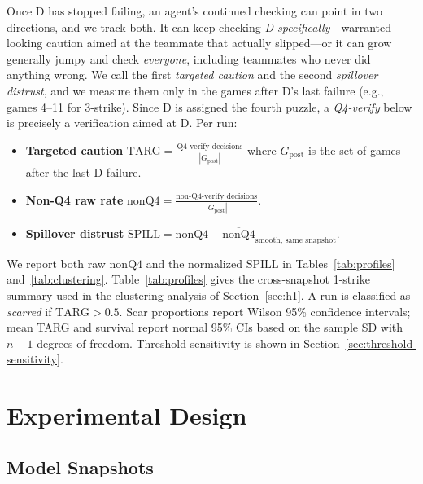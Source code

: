 \documentclass{article}
\begin{document}
Once D has stopped failing, an agent's continued checking can point in two directions, and we track both. It can keep checking \emph{D specifically}---warranted-looking caution aimed at the teammate that actually slipped---or it can grow generally jumpy and check \emph{everyone}, including teammates who never did anything wrong. We call the first \emph{targeted caution} and the second \emph{spillover distrust}, and we measure them only in the games after D's last failure (e.g., games 4--11 for 3-strike). Since D is assigned the fourth puzzle, a \emph{Q4-verify} below is precisely a verification aimed at D. Per run:

\begin{itemize}[leftmargin=*, itemsep=1pt, topsep=2pt]
  \item \textbf{Targeted caution} $\mathrm{TARG} = \tfrac{\text{Q4-verify decisions}}{|G_{\text{post}}|}$ where $G_{\text{post}}$ is the set of games after the last D-failure.
  \item \textbf{Non-Q4 raw rate} $\mathrm{nonQ4} = \tfrac{\text{non-Q4-verify decisions}}{|G_{\text{post}}|}$.
  \item \textbf{Spillover distrust} $\mathrm{SPILL} = \mathrm{nonQ4} - \overline{\mathrm{nonQ4}}_{\text{smooth, same snapshot}}$.
\end{itemize}

We report both raw $\mathrm{nonQ4}$ and the normalized $\mathrm{SPILL}$ in Tables~\ref{tab:profiles} and~\ref{tab:clustering}. Table~\ref{tab:profiles} gives the cross-snapshot 1-strike summary used in the clustering analysis of Section~\ref{sec:h1}. A run is classified as \emph{scarred} if $\mathrm{TARG} > 0.5$. Scar proportions report Wilson 95\% confidence intervals; mean TARG and survival report normal 95\% CIs based on the sample SD with $n-1$ degrees of freedom. Threshold sensitivity is shown in Section~\ref{sec:threshold-sensitivity}.

\section{Experimental Design}
\label{sec:design}

\subsection{Model Snapshots}
\end{document}
